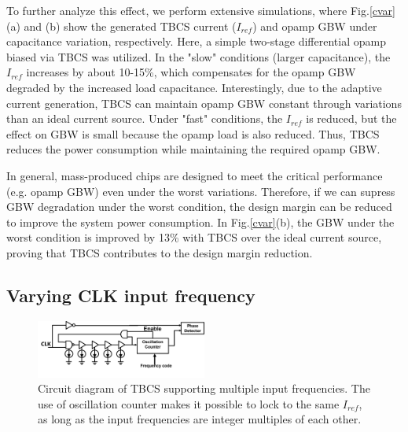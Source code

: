 \documentclass[paper]{ieice}
\begin{document}
To further analyze this effect, we perform extensive simulations, where Fig.\ref{cvar}(a) and (b) show the generated TBCS current ($I_{ref}$) and opamp GBW under capacitance variation, respectively. Here, a simple two-stage differential opamp biased via TBCS was utilized. In the "slow" conditions (larger capacitance), the $I_{ref}$ increases by about 10-15\%, which compensates for the opamp GBW degraded by the increased load capacitance. Interestingly, due to the adaptive current generation, TBCS can maintain opamp GBW constant through variations than an ideal current source. Under "fast" conditions, the $I_{ref}$ is reduced, but the effect on GBW is small because the opamp load is also reduced. Thus, TBCS reduces the power consumption while maintaining the required opamp GBW. 

In general, mass-produced chips are designed to meet the critical performance (e.g. opamp GBW) even under the worst variations. Therefore, if we can supress GBW degradation under the worst condition, the design margin can be  reduced to improve the system power consumption. In Fig.\ref{cvar}(b), the GBW under the worst condition is improved by 13\% with TBCS over the ideal current source, proving that TBCS contributes to the design margin reduction.

\subsection{Varying CLK input frequency}
\begin{figure}[!t]
\centering
 \includegraphics[width=0.5\textwidth]{figs/osc_tbcs.png}
  \caption{Circuit diagram of TBCS supporting multiple input frequencies. The use of oscillation  counter makes it possible to lock to the same $I_{ref}$, as long as the input frequencies are integer multiples of each other.}
\label{counter}
\end{figure}
\end{document}
